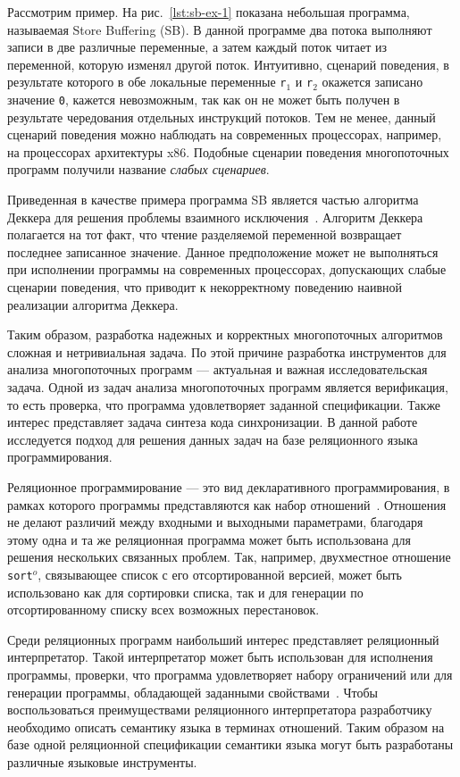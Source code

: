 Рассмотрим пример. 
На рис.~\ref{lst:sb-ex-1} показана небольшая программа, 
называемая Store Buffering (SB).
В данной программе два потока выполняют записи в две различные переменные, 
а затем каждый поток читает из переменной, которую изменял другой поток.
Интуитивно, сценарий поведения, в результате которого в обе локальные переменные 
\texttt{r$_1$} и \texttt{r$_2$} окажется записано значение \texttt{0}, кажется невозможным,
так как он не может быть получен в результате чередования отдельных инструкций потоков.
Тем не менее, данный сценарий поведения можно наблюдать на современных процессорах, 
например, на процессорах архитектуры x86.
Подобные сценарии поведения многопоточных программ получили название \emph{слабых сценариев}.

Приведенная в качестве примера программа SB является частью алгоритма Деккера 
для решения проблемы взаимного исключения~\cite{dijkstra1968cooperating}.
Алгоритм Деккера полагается на тот факт, 
что чтение разделяемой переменной возвращает последнее записанное значение.
Данное предположение может не выполняться 
при исполнении программы на современных процессорах, 
допускающих слабые сценарии поведения,
что приводит к некорректному поведению наивной реализации алгоритма Деккера.

Таким образом, разработка надежных и корректных 
многопоточных алгоритмов сложная и нетривиальная задача.
По этой причине разработка инструментов для анализа многопоточных программ --- 
актуальная и важная исследовательская задача.
Одной из задач анализа многопоточных программ является верификация,
то есть проверка, что программа удовлетворяет заданной спецификации.
Также интерес представляет задача синтеза кода синхронизации.
В данной работе исследуется подход для решения данных задач 
на базе реляционного языка программирования.

Реляционное программирование --- это вид декларативного программирования, 
в рамках которого программы представляются как набор отношений~\cite{byrd2009relational}.
Отношения не делают различий между входными и выходными параметрами,
благодаря этому одна и та же реляционная программа может быть использована
для решения нескольких связанных проблем. 
Так, например, двухместное отношение \texttt{sort$^o$}, связывающее список 
с его отсортированной версией, может быть использовано как для сортировки списка, 
так и для генерации по отсортированному списку всех возможных перестановок.

Среди реляционных программ наибольший интерес представляет реляционный интерпретатор.
Такой интерпретатор может быть использован для исполнения программы, 
проверки, что программа удовлетворяет набору ограничений
или для генерации программы, обладающей заданными свойствами~\cite{byrd2017unified}.
Чтобы воспользоваться преимуществами реляционного интерпретатора 
разработчику необходимо описать семантику языка в терминах отношений.
Таким образом на базе одной реляционной спецификации семантики языка
могут быть разработаны различные языковые инструменты. 

